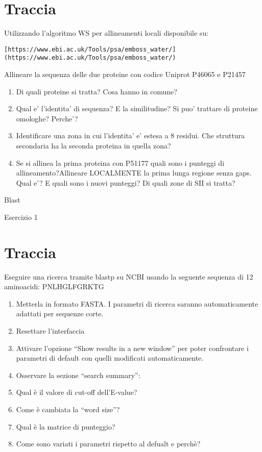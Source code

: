 \documentclass{article}
\begin{document}
\section*{Traccia}
Utilizzando l’algoritmo WS per allineamenti locali disponibile su: \begin{verbatim}[https://www.ebi.ac.uk/Tools/psa/emboss_water/](https://www.ebi.ac.uk/Tools/psa/emboss_water/)\end{verbatim}
Allineare la sequenza delle due proteine con codice Uniprot P46065 e P21457
\begin{enumerate}
   \item Di quali proteine si tratta? Cosa hanno in comune?
   \item Qual e’ l’identita’ di sequenza? E la similitudine? Si puo’ trattare di proteine omologhe? Perche’?
   \item Identificare una zona in cui l’identita’ e’ estesa a 8 residui. Che struttura secondaria ha la seconda proteina in quella zona?
   \item Se si allinea la prima proteina con P51177 quali sono i punteggi di allineamento?Allineare LOCALMENTE la prima lunga regione senza gaps. Qual e’? E quali sono i nuovi punteggi? Di quali zone di SII si tratta?
\end{enumerate}

\begin{center}
   \Huge
   Blast
\end{center}

\begin{center}
   \huge
   Esercizio 1
\end{center}
\section*{Traccia}
Eseguire una ricerca tramite blastp su NCBI usando la seguente sequenza di 12 aminoacidi:
PNLHGLFGRKTG
\begin{enumerate}
   \item Metterla in formato FASTA. I parametri di ricerca saranno automaticamente adattati per sequenze corte.
   \item Resettare l’interfaccia
   \item Attivare l’opzione “Show results in a new window” per poter confrontare i parametri di default con quelli modificati automaticamente.
   \item Osservare la sezione “search summary”:
   \item Qual è il valore di cut-off dell’E-value?
   \item Come è cambiata la “word size”?
   \item Qual è la matrice di punteggio?
   \item Come sono variati i parametri rispetto al defualt e perchè?
\end{enumerate}
\end{document}
